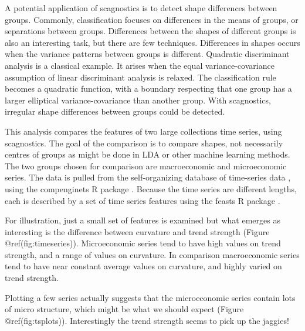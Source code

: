 A potential application of scagnostics is to detect shape differences
between groups. Commonly, classification focuses on differences in the
means of groups, or separations between groups. Differences between the
shapes of different groups is also an interesting task, but there are
few techniques. Differences in shapes occurs when the variance patterns
between groups is different. Quadratic discriminant analysis is a
classical example. It arises when the equal variance-covariance
assumption of linear discriminant analysis is relaxed. The
classification rule becomes a quadratic function, with a boundary
respecting that one group has a larger elliptical variance-covariance
than another group. With scagnostics, irregular shape differences
between groups could be detected.

This analysis compares the features of two large collections time
series, using scagnostics. The goal of the comparison is to compare
shapes, not necessarily centres of groups as might be done in LDA or
other machine learning methods. The two groups chosen for comparison are
macroeconomic and microeconomic series. The data is pulled from the
self-organizing database of time-series data \citep{sots}, using the
compenginets R package \citep{compenginets}. Because the time series are
different lengths, each is described by a set of time series features
\citep[chapter 4 of][]{fpp} using the feasts R package \citep{feasts}.

For illustration, just a small set of features is examined but what
emerges as interesting is the difference between curvature and trend
strength (Figure @ref(fig:timeseries)). Microeconomic series tend to
have high values on trend strength, and a range of values on curvature.
In comparison macroeconomic series tend to have near constant average
values on curvature, and highly varied on trend strength.

Plotting a few series actually suggests that the microeconomic series
contain lots of micro structure, which might be what we should expect
(Figure @ref(fig:tsplots)). Interestingly the trend strength seems to
pick up the jaggies!

